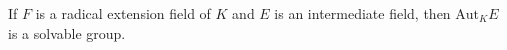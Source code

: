 If $F$ is a radical extension field of $K$ and $E$ is an intermediate field, then $\mathrm{Aut}_K E$ is a solvable group.
